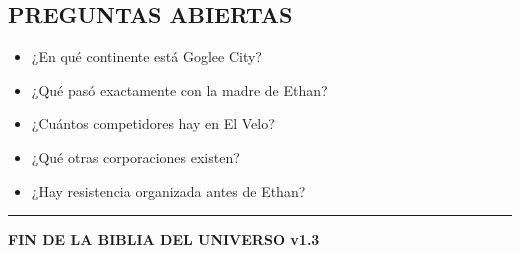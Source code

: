 \documentclass[11pt,a4paper]{report}
\begin{document}
\subsection{PREGUNTAS ABIERTAS}

\begin{itemize}
  \item ¿En qué continente está Goglee City?
  \item ¿Qué pasó exactamente con la madre de Ethan?
  \item ¿Cuántos competidores hay en El Velo?
  \item ¿Qué otras corporaciones existen?
  \item ¿Hay resistencia organizada antes de Ethan?

\end{itemize}
\bigskip\hrule\bigskip

\textbf{FIN DE LA BIBLIA DEL UNIVERSO v1.3}
\end{document}
